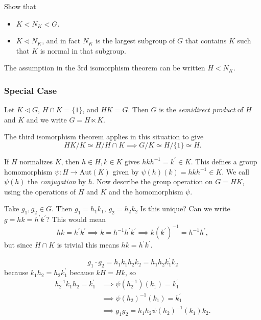 \documentclass{article}
\begin{document}
\begin{exer}
Show that
\begin{itemize}
  \item{$K < N_K < G$.}
  \item{$K \triangleleft N_K$, and in fact $N_K$ is the largest
      subgroup of $G$ that contains $K$ such that $K$ is normal in
      that subgroup.}
\end{itemize}

\end{exer}

\begin{remark}
The assumption in the 3rd isomorphism theorem can be written $H < N_K$.
\end{remark}

\subsubsection{Special Case}
\begin{defn}
Let $K \triangleleft G$, $H \cap K = \{ 1 \}$, and $HK = G$.
Then $G$ is the \emph{semidirect product} of $H$ and $K$ and we write
$G = H \ltimes K$.
\end{defn}


The third isomorphism theorem applies in this situation to give
$$
HK / K \simeq H / H \cap K \implies
G / K  \simeq H / \{ 1 \} \simeq H.
$$

If $H$ normalizes $K$, then
$h \in H, k \in K$ gives $h k h^{-1} = k^\prime \in K$. This defnes a
group homomorphism $\psi : H \to \mathrm{Aut}(K)$ given by
$\psi(h)(k) = h k h^{-1} \in K$. We call $\psi(h)$ the
\emph{conjugation} by $h$. Now describe the group operation on 
$G = HK$, using the operations of $H$ and $K$ and the homomorphism $\psi$.

Take $g_1, g_2 \in G$. Then $g_1 = h_1 k_1$, $g_2 = h_2 k_2$ Is this
unique? Can we write $g = hk = h^\prime k^\prime$? This would mean
$$
hk = h^\prime k^\prime 
  \implies k = h^{-1} h^\prime k^\prime
  \implies k (k^\prime)^{-1} = h^{-1} h^\prime,
$$
but since $H \cap K$ is trivial this means
$hk = h^\prime k^\prime$.

$$g_1 \cdot g_2 = h_1 k_1 h_2 k_2 = h_1 h_2 k_1^\prime k_2$$
because $k_1 h_2 = h_2 k_1^\prime$ because $kH = Hk$, so
\begin{align*}
h_2^{-1} k_1 h_2 = k_1^\prime
& \implies
  \psi(h_2^{-1})(k_1) = k_1^\prime \\
& \implies
  \psi(h_2)^{-1}(k_1) = k_1^\prime \\
& \implies g_1 g_2 = h_1 h_2 \psi(h_2)^{-1} (k_1) k_2.
\end{align*}
\end{document}
